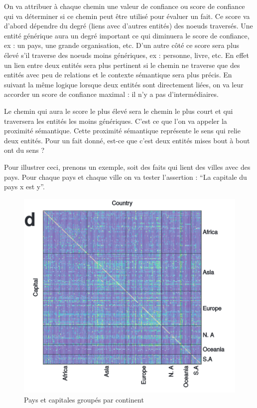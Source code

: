 On va attribuer à chaque chemin une valeur de confiance ou score de confiance qui va déterminer si ce chemin peut être utilisé pour évaluer un fait. Ce score va d'abord dépendre du degré (liens avec d'autres entités) des noeuds traversés. Une entité générique aura un degré important ce qui diminuera le score de confiance, ex : un pays, une grande organisation, etc. D'un autre côté ce score sera plus élevé s'il traverse des noeuds moins génériques, ex : personne, livre, etc. En effet un lien entre deux entités sera plus pertinent si le chemin ne traverse que des entités avec peu de relations et le contexte sémantique sera plus précis. En suivant la même logique lorsque deux entités sont directement liées, on va leur accorder un score de confiance maximal : il n'y a pas d'intermédiaires.

Le chemin qui aura le score le plus élevé sera le chemin le plus court et qui traversera les entités les moins génériques. C'est ce que l'on va appeler la proximité sémantique. Cette proximité sémantique représente le sens qui relie deux entités. Pour un fait donné, est-ce que c'est deux entités mises bout à bout ont du sens ? 

Pour illustrer ceci, prenons un exemple, soit des faits qui lient des villes avec des pays. Pour chaque pays et chaque ville on va tester l'assertion : \enquote{La capitale du pays x est y}.

\begin{figure}[h]
\centering
\includegraphics[draft=false, scale=0.5]{imgs/country_cap_check.PNG}
\caption{Pays et capitales groupés par continent}
\label{fig1}
\end{figure}

